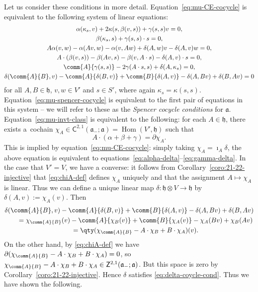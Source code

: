 \documentclass[pdftex]{sigma}
\numberwithin{equation}{section}
\newcommand{\fa}{\mathfrak{a}}
\newcommand{\fh}{\mathfrak{h}}
\newcommand{\ssC}{\mathsf{C}}
\newcommand{\ssZ}{\mathsf{Z}}
\newcommand{\1}{\mathbbm{1}}
\DeclareMathOperator{\Hom}{Hom}
\begin{document}
Let us consider these conditions in more detail. Equation~\eqref{eq:mu-CE-cocycle} is equivalent to the following system of linear equations:
\begin{gather}
	\alpha(\kappa_s,v) + 2\kappa(s,\beta(v,s)) + \gamma(s,s)v = 0,\label{eq:22-spencer-cocycle-vss} \\
	\beta(\kappa_s,s) + \gamma(s,s)\cdot s = 0,\label{eq:22-spencer-cocycle-sss}	\\
	A\alpha(v,w) - \alpha(Av,w) - \alpha(v,Aw) + \delta(A,w)v - \delta(A,v)w = 0,\label{eq:alpha-delta} \\
	A\cdot(\beta(v,s)) - \beta(Av,s) - \beta(v,A\cdot s) - \delta(A,v)\cdot s = 0,\label{eq:beta-delta} \\
	\comm{A}{\gamma(s,s)} - 2\gamma(A\cdot s,s) + \delta(A,\kappa_s) = 0,\label{eq:gamma-delta} \\
	\delta(\comm{A}{B},v) - \comm{A}{\delta(B,v)} + \comm{B}{\delta(A,v)} - \delta(A,Bv) + \delta(B,Av) = 0 \label{eq:delta-coycle-cond}
\end{gather}
for all $A,B\in\fh$, $v,w\in V'$ and $s\in S'$, where again $\kappa_s=\kappa(s,s)$. Equation~\eqref{eq:mu-spencer-cocycle} is equivalent to the first pair of equations in this system -- we will refer to these as the \emph{Spencer cocycle conditions} for $\fa$. Equation~\eqref{eq:mu-invt-class} is equivalent to the following: for each $A\in\fh$, there exists a~cochain $\chi_A\in \ssC^{2,1}(\fa_-;\fa)=\Hom(V',\fh)$ such that
\begin{equation}\label{eq:chiA-def}
	A\cdot(\alpha+\beta+\gamma) = \partial\chi_A.
\end{equation}
This is implied by equation~\eqref{eq:mu-CE-cocycle}: simply taking $\chi_A=\imath_A\delta$, the above equation is equivalent to equations~\eqref{eq:alpha-delta}--\eqref{eq:gamma-delta}. In the case that $V'=V$, we have a converse: it follows from Corollary~\ref{coro:21-22-injective} that \eqref{eq:chiA-def} defines $\chi_A$ uniquely and that the assignment $A\mapsto\chi_A$ is linear. Thus we can define a unique linear map $\delta\colon \fh\otimes V\to\fh$ by $\delta(A,v):=\chi_A(v)$. Then
\begin{gather*}
	\delta(\comm{A}{B},v) - \comm{A}{\delta(B,v)} + \comm{B}{\delta(A,v)} - \delta(A,Bv) + \delta(B,Av)\\
	\qquad= \chi_{\comm{A}{B}}(v) - \comm{A}{\chi_B(v)} + \comm{B}{\chi_A(v)}	- \chi_A(Bv) + \chi_B(Av)	\\
	\qquad= \qty(\chi_{\comm{A}{B}} - A\cdot\chi_B + B\cdot\chi_A)(v).
\end{gather*}
On the other hand, by \eqref{eq:chiA-def} we have
$\partial(\chi_{\comm{A}{B}} - A\cdot\chi_B + B\cdot\chi_A) = 0$,
so $\chi_{\comm{A}{B}} - A\cdot\chi_B + B\cdot\chi_A\in\ssZ^{2,1}(\fa_-;\fa)$. But this space is zero by Corollary~\ref{coro:21-22-injective}. Hence $\delta$ satisfies \eqref{eq:delta-coycle-cond}. Thus we have shown the following.
\end{document}
